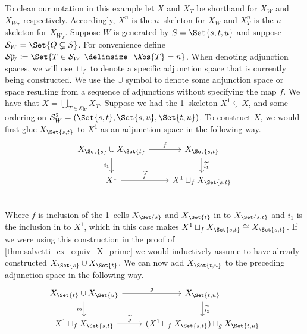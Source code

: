 \documentclass[class=article, crop=false]{standalone}
\begin{document}
\begin{example}
    \label{eg:inductive_construction}
    To clean our notation in this example let $X$ and $X_T$ be shorthand for $X_W$ and $X_{W_T}$ respectively. Accordingly, $X^n$ is the $n$--skeleton for $X_W$ and $X_T^n$ is the $n$--skeleton for $X_{W_T}$.
    Suppose $W$ is generated by $S = \Set{s,t,u}$ and suppose $\mathcal{S}_W  = \Set{Q \subsetneq S}$. For convenience define $\mathcal{S}_W^n \coloneq \Set{T \in \mathcal{S}_W \given \Abs{T} = n }$. When denoting adjunction spaces, we will use $\sqcup_f$ to denote a specific adjunction space that is currently being constructed. We use the $\cup$ symbol to denote some adjunction space or space resulting from a sequence of adjunctions without specifying the map $f$. We have that $X = \bigcup_{T \in \mathcal{S}_W^2} X_T$. Suppose we had the 1--skeleton $X^1 \subsetneq X$, and some ordering on $\mathcal{S}_W^2 = (\Set{s,t}, \Set{s,u}, \Set{t,u})$. To construct $X$, we would first glue $X_{\Set{s,t}}$ to $X^1$ as an adjunction space in the following way.
    \begin{equation}
        \begin{tikzcd}
                X_{{\Set{s}}} \cup X_{{\Set{t}}} \ar[r, "f" ] \ar[d, "i_1"']   &    X_{{\Set{s,t}}} \ar[d, "\widetilde{i_1}"]    \\
                X^1 \ar[r, "\widetilde{f}"]                                 &   X^1 \sqcup_f X_{{\Set{s,t}}}            \\
        \end{tikzcd}
        \label{eqn:inductive_gluing_step_1}
    \end{equation}
    Where $f$ is inclusion of the 1--cells $X_{{\Set{s}}}$ and $X_{{\Set{t}}}$ in to $X_{\Set{s,t}}$ and $i_1$ is the inclusion in to $X^1$, which in this case makes $X^1 \sqcup_f X_{{\Set{s,t}}} \cong X_{{\Set{s,t}}}$. If we were using this construction in the proof of \cref{thm:salvetti_cx_equiv_X_prime} we would inductively assume to have already constructed $ X_{{\Set{s}}} \cup X_{{\Set{t}}}$.
    We can now add $X_{\Set{t,u}}$ to the preceding adjunction space in the following way.
    \begin{equation}
        \begin{tikzcd}
                X_{{\Set{t}}} \cup X_{{\Set{u}}} \ar[r, "g" ] \ar[d, "i_2"']   &  X_{{\Set{t,u}}}   \ar[d, "\widetilde{i_2}"]    \\
                X^1 \sqcup_f X_{{\Set{s,t}}} \ar[r, "\widetilde{g}"]            &   (X^1 \sqcup_f X_{{\Set{s,t}}}) \sqcup_g X_{{\Set{t,u}}}            \\

\end{tikzcd}
\end{equation}
\end{example}
\end{document}
